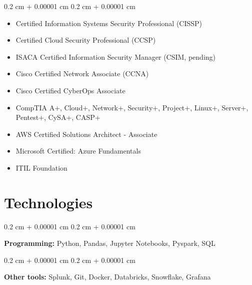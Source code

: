 \documentclass[10pt, letterpaper]{article}
\newenvironment{highlightsforbulletentries}{
    \begin{itemize}[
        topsep=0.10 cm,
        parsep=0.10 cm,
        partopsep=0pt,
        itemsep=0pt,
        leftmargin=10pt
    ]
}{
    \end{itemize}
} %
\newenvironment{onecolentry}{
    \begin{adjustwidth}{
        0.2 cm + 0.00001 cm
    }{
        0.2 cm + 0.00001 cm
    }
}{
    \end{adjustwidth}
} %
\begin{document}
    \begin{onecolentry}
        \begin{highlightsforbulletentries}


        \item Certified Information Systems Security Professional (CISSP)

        \item Certified Cloud Security Professional (CCSP)

        \item ISACA Certified Information Security Manager (CSIM, pending)

        \item Cisco Certified Network Associate (CCNA)

        \item Cisco Certified CyberOps Associate

        \item CompTIA A+, Cloud+, Network+, Security+, Project+, Linux+, Server+, Pentest+, CySA+, CASP+

        \item AWS Certified Solutions Architect - Associate

        \item Microsoft Certified: Azure Fundamentals

        \item ITIL Foundation


        \end{highlightsforbulletentries}
    \end{onecolentry}

    \section{Technologies}



        
        \begin{onecolentry}
            \textbf{Programming:} Python, Pandas, Jupyter Notebooks, Pyspark, SQL
        \end{onecolentry}

        \vspace{0.2 cm}

        \begin{onecolentry}
            \textbf{Other tools:} Splunk, Git, Docker, Databricks, Snowflake, Grafana
        \end{onecolentry}
\end{document}
